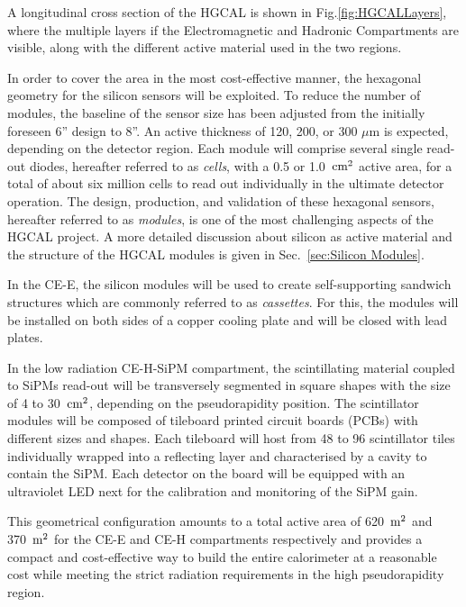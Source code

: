 A longitudinal cross section of the HGCAL is shown in Fig.\ref{fig:HGCALLayers}, where the multiple layers if the Electromagnetic and Hadronic Compartments are visible, along with the different active material used in the two regions.

\bigbreak

In order to cover the area in the most cost-effective manner, the hexagonal geometry for the silicon sensors will be exploited. To reduce the number of modules, the baseline of the sensor size has been adjusted from the initially foreseen 6\mbox{''} design to 8\mbox{''}. An active thickness of 120, 200, or 300 $\mu$m is expected, depending on the detector region.
Each module will comprise several single read-out diodes, hereafter referred to as \textit{cells}, with a 0.5 or 1.0~$\textnormal{cm}^2$ active area, for a total of about six million cells to read out individually in the ultimate detector operation. 
The design, production, and validation of these hexagonal sensors, hereafter referred to as \textit{modules}, is one of the most challenging aspects of the HGCAL project. A more detailed discussion about silicon as active material and the structure of the HGCAL modules is given in Sec.~\ref{sec:Silicon Modules}. 

In the CE-E, the silicon modules will be used to create self-supporting sandwich structures which are commonly referred to as \textit{cassettes}. For this, the modules will be installed on both sides of a copper cooling plate and will be closed with lead plates.

In the low radiation CE-H-SiPM compartment, the scintillating material coupled to SiPMs read-out will be transversely segmented in square shapes with the size of 4 to 30~$\textnormal{cm}^2$, depending on the pseudorapidity position. 
The scintillator modules will be composed of tileboard printed circuit boards (PCBs) with different sizes and shapes. Each tileboard will host from 48 to 96 scintillator tiles individually wrapped into a reflecting layer and characterised by a cavity to contain the SiPM. Each detector on the board will be equipped with an ultraviolet LED next for the calibration and monitoring of the SiPM gain. 

This geometrical configuration amounts to a total active area of 620~$\textnormal{m}^2$ and 370~$\textnormal{m}^2$ for the CE-E and CE-H compartments respectively and provides a compact and cost-effective way to build the entire calorimeter at a reasonable cost while meeting the strict radiation requirements in the high pseudorapidity region.

